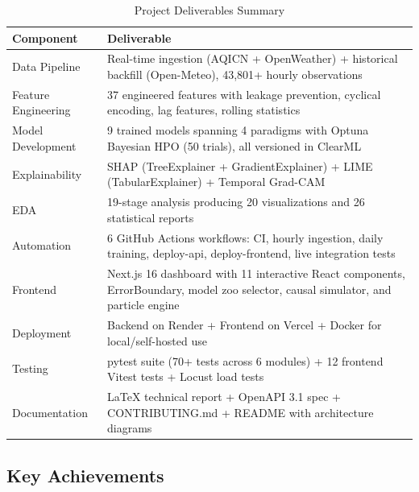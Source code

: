 \documentclass[12pt, a4paper, oneside]{article}
\begin{document}
\begin{table}[H]
\centering
\caption{Project Deliverables Summary}
\label{tab:deliverables}
\begin{tabularx}{\textwidth}{l X}
\toprule
\textbf{Component} & \textbf{Deliverable} \\
\midrule
Data Pipeline & Real-time ingestion (AQICN + OpenWeather) + historical backfill (Open-Meteo), 43,801+ hourly observations \\
Feature Engineering & 37 engineered features with leakage prevention, cyclical encoding, lag features, rolling statistics \\
Model Development & 9 trained models spanning 4 paradigms with Optuna Bayesian HPO (50 trials), all versioned in ClearML \\
Explainability & SHAP (TreeExplainer + GradientExplainer) + LIME (TabularExplainer) + Temporal Grad-CAM \\
EDA & 19-stage analysis producing 20 visualizations and 26 statistical reports \\
Automation & 6 GitHub Actions workflows: CI, hourly ingestion, daily training, deploy-api, deploy-frontend, live integration tests \\
Frontend & Next.js 16 dashboard with 11 interactive React components, ErrorBoundary, model zoo selector, causal simulator, and particle engine \\
Deployment & Backend on Render + Frontend on Vercel + Docker for local/self-hosted use \\
Testing & pytest suite (70+ tests across 6 modules) + 12 frontend Vitest tests + Locust load tests \\
Documentation & LaTeX technical report + OpenAPI 3.1 spec + CONTRIBUTING.md + README with architecture diagrams \\
\bottomrule
\end{tabularx}
\end{table}

\subsection{Key Achievements}
\end{document}
